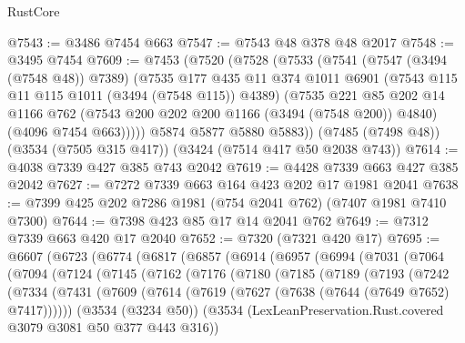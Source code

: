 \begin{lexlean}{RustCore}
\begin{coremodule}
@7543 := @3486 @7454 @663
@7547 := @7543 @48 @378 @48 @2017
@7548 := @3495 @7454
@7609 := @7453
    (@7520
      (@7528
        (@7533
          (@7541
            (@7547 (@3494 (@7548 @48)) @7389)
            (@7535
              @177
              @435
              @11
              @374
              @1011
              @6901
              (@7543 @115 @11 @115 @1011 (@3494 (@7548 @115)) @4389)
              (@7535
                @221
                @85
                @202
                @14
                @1166
                @762
                (@7543 @200 @202 @200 @1166 (@3494 (@7548 @200)) @4840)
                (@4096 @7454 @663)))))
        @5874
        @5877
        @5880
        @5883))
    (@7485 (@7498 @48))
    (@3534 (@7505 @315 @417))
    (@3424 (@7514 @417 @50 @2038 @743))
@7614 := @4038 @7339 @427 @385 @743 @2042
@7619 := @4428 @7339 @663 @427 @385 @2042
@7627 := @7272 @7339 @663 @164 @423 @202 @17 @1981 @2041
@7638 := @7399 @425 @202 @7286 @1981 (@754 @2041 @762) (@7407 @1981 @7410 @7300)
@7644 := @7398 @423 @85 @17 @14 @2041 @762
@7649 := @7312 @7339 @663 @420 @17 @2040
@7652 := @7320 (@7321 @420 @17)
@7695 := @6607
    (@6723
      (@6774
        (@6817
          (@6857
            (@6914
              (@6957
                (@6994
                  (@7031
                    (@7064
                      (@7094
                        (@7124
                          (@7145
                            (@7162
                              (@7176
                                (@7180
                                  (@7185
                                    (@7189
                                      (@7193
                                        (@7242
                                          (@7334
                                            (@7431
                                              (@7609
                                                (@7614
                                                  (@7619
                                                    (@7627 (@7638 (@7644 (@7649 @7652) @7417))))))
                                              (@3534 (@3234 @50))
                                              (@3534
                                                (LexLeanPreservation.Rust.covered
                                                  @3079
                                                  @3081
                                                  @50
                                                  @377
                                                  @443
                                                  @316))

\end{coremodule}
\end{lexlean}
